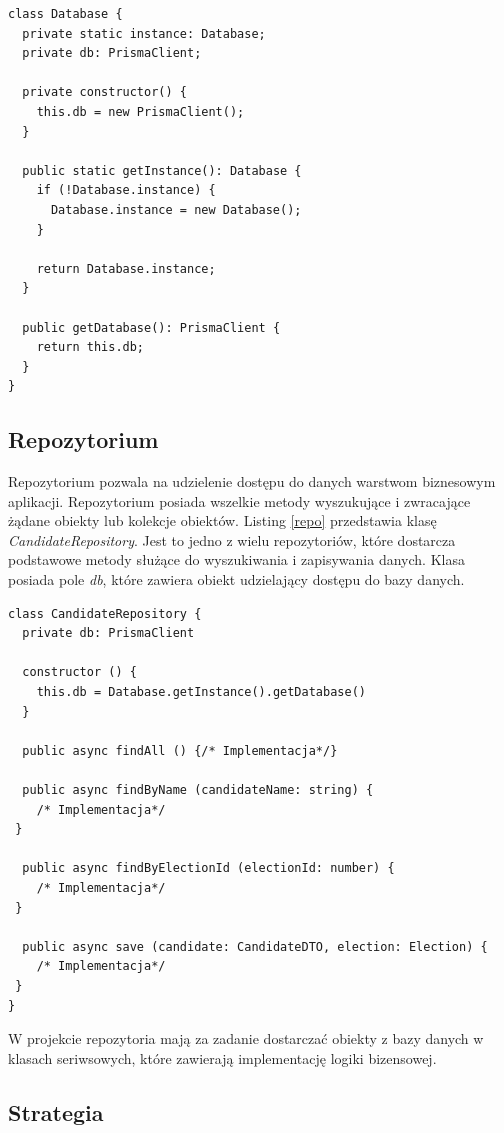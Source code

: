 \documentclass[a4paper,12pt]{book}
\begin{document}
\begin{lstlisting}[style=ES6, caption={Klasa \textit{Database}. Singleton.}, label={singleton}]
class Database {
  private static instance: Database;
  private db: PrismaClient;

  private constructor() {
    this.db = new PrismaClient();
  }

  public static getInstance(): Database {
    if (!Database.instance) {
      Database.instance = new Database();
    }

    return Database.instance;
  }

  public getDatabase(): PrismaClient {
    return this.db;
  }
}
\end{lstlisting}

\subsection{Repozytorium}

Repozytorium pozwala na udzielenie dostępu do danych warstwom biznesowym aplikacji. Repozytorium posiada wszelkie metody wyszukujące i zwracające żądane obiekty lub kolekcje obiektów. Listing \ref{repo} przedstawia klasę \textit{CandidateRepository}. Jest to jedno z wielu repozytoriów, które dostarcza podstawowe metody służące do wyszukiwania i zapisywania danych. Klasa posiada pole \textit{db}, które zawiera obiekt udzielający dostępu do bazy danych.

\begin{lstlisting}[style=ES6, caption={Klasa \textit{CandidateRepository}.}, label={repo}]
class CandidateRepository {
  private db: PrismaClient

  constructor () {
    this.db = Database.getInstance().getDatabase()
  }

  public async findAll () {/* Implementacja*/}

  public async findByName (candidateName: string) {
	/* Implementacja*/
 }

  public async findByElectionId (electionId: number) {
	/* Implementacja*/
 }

  public async save (candidate: CandidateDTO, election: Election) {
	/* Implementacja*/
 }
}
\end{lstlisting}

W projekcie repozytoria mają za zadanie dostarczać obiekty z bazy danych w klasach seriwsowych, które zawierają implementację logiki bizensowej.

\subsection{Strategia}
\end{document}
